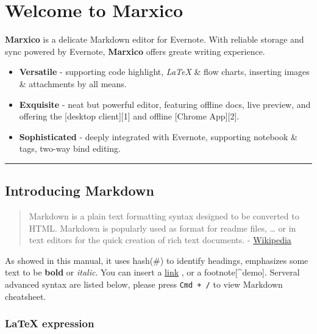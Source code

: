 \section{Welcome to Marxico}\label{welcome-to-marxico}

\textbf{Marxico} is a delicate Markdown editor for Evernote. With
reliable storage and sync powered by Evernote, \textbf{Marxico} offers
greate writing experience.

\begin{itemize}
\tightlist
\item
  \textbf{Versatile} - supporting code highlight, \emph{LaTeX} \& flow
  charts, inserting images \& attachments by all means.
\item
  \textbf{Exquisite} - neat but powerful editor, featuring offline docs,
  live preview, and offering the {[}desktop client{]}{[}1{]} and offline
  {[}Chrome App{]}{[}2{]}.
\item
  \textbf{Sophisticated} - deeply integrated with Evernote, supporting
  notebook \& tags, two-way bind editing.
\end{itemize}

\begin{center}\rule{0.5\linewidth}{\linethickness}\end{center}

\subsection{Introducing Markdown}\label{introducing-markdown}

\begin{quote}
Markdown is a plain text formatting syntax designed to be converted to
HTML. Markdown is popularly used as format for readme files, \ldots{} or
in text editors for the quick creation of rich text documents. -
\href{http://en.wikipedia.org/wiki/Markdown}{Wikipedia}
\end{quote}

As showed in this manual, it uses hash(\#) to identify headings,
emphasizes some text to be \textbf{bold} or \emph{italic}. You can
insert a \href{http://www.example.com}{link} , or a
footnote{[}\^{}demo{]}. Serveral advanced syntax are listed below,
please press \texttt{Cmd\ +\ /} to view Markdown cheatsheet.

\subsubsection{LaTeX expression}\label{latex-expression}

